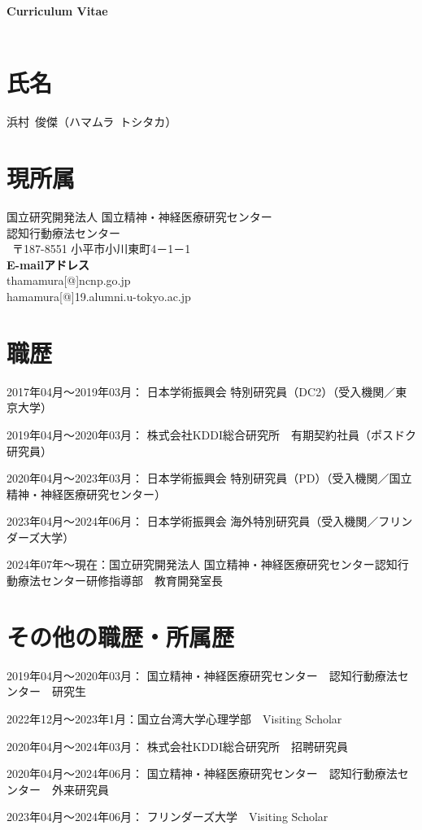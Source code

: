 \documentclass[11pt,a4paper]{article}
\begin{document}
\begin{center}
		{\LARGE \textbf{Curriculum Vitae}}\\~\\
\end{center}

\noindent
\section{氏名}
浜村\ 俊傑（ハマムラ\ トシタカ）
\section{現所属}
国立研究開発法人 国立精神・神経医療研究センター\\
認知行動療法センター\\\
〒187-8551 小平市小川東町4－1－1\\
\textbf{E-mailアドレス}\\
thamamura[@]ncnp.go.jp\\
hamamura[@]19.alumni.u-tokyo.ac.jp\\

\section{職歴}
\begin{description}
	\item 2017年04月～2019年03月： 日本学術振興会 特別研究員（DC2）（受入機関／東京大学）
	\item 2019年04月～2020年03月： 株式会社KDDI総合研究所　有期契約社員（ポスドク研究員）
	\item 2020年04月～2023年03月： 日本学術振興会 特別研究員（PD）（受入機関／国立精神・神経医療研究センター）
	\item 2023年04月～2024年06月： 日本学術振興会 海外特別研究員（受入機関／フリンダーズ大学）
	\item 2024年07年～現在：国立研究開発法人 国立精神・神経医療研究センター認知行動療法センター研修指導部　教育開発室長
\end{description}

\section{その他の職歴・所属歴}
\begin{description}
	\item 2019年04月～2020年03月： 国立精神・神経医療研究センター　認知行動療法センター　研究生
	\item 2022年12月～2023年1月：国立台湾大学心理学部　Visiting Scholar
	\item 2020年04月～2024年03月： 株式会社KDDI総合研究所　招聘研究員
	\item 2020年04月～2024年06月： 国立精神・神経医療研究センター　認知行動療法センター　外来研究員
	\item 2023年04月～2024年06月： フリンダーズ大学　Visiting Scholar
\end{description}
\end{document}
